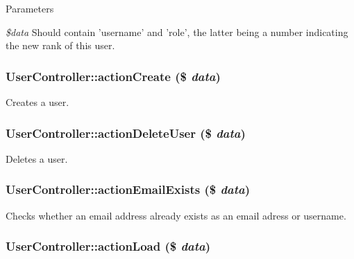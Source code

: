 \begin{DoxyParams}{Parameters}
\item[{\em \$data}]Should contain 'username' and 'role', the latter being a number indicating the new rank of this user. \end{DoxyParams}
\hypertarget{classUserController_a76cd84168a31f120db7c870d122f2270}{
\subsubsection[{actionCreate}]{\setlength{\rightskip}{0pt plus 5cm}UserController::actionCreate (\$ {\em data})}}
\label{classUserController_a76cd84168a31f120db7c870d122f2270}
Creates a user. \hypertarget{classUserController_af0a863a6fb8e1abb0e5830bb787c580c}{
\subsubsection[{actionDeleteUser}]{\setlength{\rightskip}{0pt plus 5cm}UserController::actionDeleteUser (\$ {\em data})}}
\label{classUserController_af0a863a6fb8e1abb0e5830bb787c580c}
Deletes a user. \hypertarget{classUserController_a6a6bb3ce82990762f17460bf6b57595f}{
\subsubsection[{actionEmailExists}]{\setlength{\rightskip}{0pt plus 5cm}UserController::actionEmailExists (\$ {\em data})}}
\label{classUserController_a6a6bb3ce82990762f17460bf6b57595f}
Checks whether an email address already exists as an email adress or username. \hypertarget{classUserController_a7295cd724ff78bf67971bc98423405e0}{
\subsubsection[{actionLoad}]{\setlength{\rightskip}{0pt plus 5cm}UserController::actionLoad (\$ {\em data})}}
\label{classUserController_a7295cd724ff78bf67971bc98423405e0}
